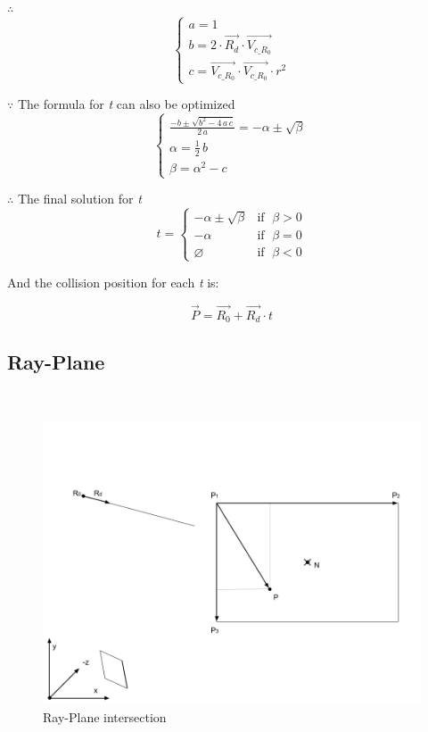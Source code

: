 $\therefore$
\[
\left\{
\begin{array}{lr}
a =1 \\
b = 2 \cdot \overrightarrow{R_d} \cdot \overrightarrow{V_{c\_R_0}} \\
c = \overrightarrow{V_{c\_R_0}} \cdot \overrightarrow{V_{c\_R_0}} \cdot r^2
\end{array}
\right.
\]

$\because$ The formula for \emph{t} can also be optimized
\[
\left\{
\begin{array}{lr}
\frac{-b \pm \sqrt{b^2 - 4\,a\,c}}{2\,a} = -\alpha \pm \sqrt{\beta} \\
\alpha = \frac{1}{2}\,b \\
\beta = \alpha^2 - c
\end{array}
\right.
\]

$\therefore$ The final solution for \emph{t}
\[
t =
\begin{cases}
 -\alpha \pm \sqrt{\beta} & \text{if }\;\beta > 0 \\
-\alpha & \text{if }\;\beta = 0 \\
\varnothing & \text{if }\;\beta < 0
\end{cases}
\]

And the collision position for each \emph{t} is:

\[
\overrightarrow{P} = \overrightarrow{R_0} + \overrightarrow{R_d} \cdot t
\]

\subsection{Ray-Plane}
\parencite{stackoverflow.ray-plane.2014} \\

\begin{figure}[H]
\caption[ray-plane-intersection]{Ray-Plane intersection}
\label{fig:ray-plane}
\centering
\includegraphics[width=\linewidth]{Figures/ray-plane-intersection.png}
\decoRule
\end{figure}

